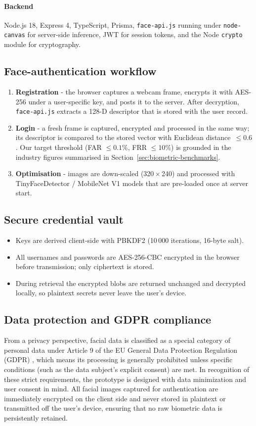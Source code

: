 \paragraph{Backend}
Node.js 18, Express 4, TypeScript, Prisma, \texttt{face-api.js} running under \texttt{node-canvas} for server-side inference, JWT for session tokens, and the Node \texttt{crypto} module for cryptography.

\subsection{Face-authentication workflow}
\begin{enumerate}
  \item \textbf{Registration} - the browser captures a webcam frame, encrypts it with AES-256 under a user-specific key, and posts it to the server. After decryption, \texttt{face-api.js} extracts a 128-D descriptor that is stored with the user record.
  \item \textbf{Login} - a fresh frame is captured, encrypted and processed in the same way; its descriptor is compared to the stored vector with Euclidean distance~$\le0.6$. Our target threshold (FAR $\leq 0.1\%$, FRR $\leq 10\%$) is grounded in the industry figures summarised in Section~\ref{sec:biometric-benchmarks}.
  \item \textbf{Optimisation} - images are down-scaled (320\,$\times$\,240) and processed with TinyFaceDetector / MobileNet V1 models that are pre-loaded once at server start.
\end{enumerate}

\subsection{Secure credential vault}
\begin{itemize}
  \item Keys are derived client-side with PBKDF2 (10\,000 iterations, 16-byte salt).  
  \item All usernames and passwords are AES-256-CBC encrypted in the browser before transmission; only ciphertext is stored.  
  \item During retrieval the encrypted blobs are returned unchanged and decrypted locally, so plaintext secrets never leave the user's device.  
\end{itemize}

\subsection{Data protection and GDPR compliance}
From a privacy perspective, facial data is classified as a special category of personal data under Article 9 of the EU General Data Protection Regulation (GDPR) \autocite{GDPR2016}, which means its processing is generally prohibited unless specific conditions (such as the data subject's explicit consent) are met. In recognition of these strict requirements, the prototype is designed with data minimization and user consent in mind. All facial images captured for authentication are immediately encrypted on the client side and never stored in plaintext or transmitted off the user's device, ensuring that no raw biometric data is persistently retained.

